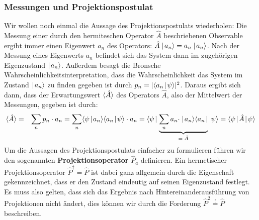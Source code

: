 \subsubsection{Messungen und Projektionspostulat}

Wir wollen noch einmal die Aussage des Projektionspostulats wiederholen: Die Messung einer durch den hermiteschen Operator $\hat{A}$ beschriebenen Observable ergibt immer einen Eigenwert $a_n$ des Operators: $\hat{A}\mid\!\!\!\,\,{a_n}\rangle=a_n\mid\!\!\!\,\,{a_n}\rangle$. Nach der Messung eines Eigenwerts $a_n$ befindet sich das System dann im zugehörigen Eigenzustand $\mid\!\!\!\,\,{a_n}\rangle$. Außerdem besagt die Bronsche Wahrscheinlichkeitsinterpretation, dass die Wahrscheinlichkeit das System im Zustand $\mid\!\!\!\,\,{a_n}\rangle$ zu finden gegeben ist durch $p_n=|\langle{a_n}\!\!\!\,\,\mid\!\!\!\,\,{\psi}\rangle|^2$. Daraus ergibt sich dann, dass der Erwartungswert $\langle\!\!\,\,\hat{A}\!\!\,\,\rangle$ des Operators $\hat{A}$, also der Mittelwert der Messungen, gegeben ist durch: 
\begin{eqnarray*}
	\EW{\hat{A}} &=& \sum_n p_n\cdot a_n = \sum_n \braket{\psi}{a_n}\braket{a_n}{\psi}\cdot a_n = \bra{\psi}\underbrace{\sum_n a_n\cdot \ket{a_n}\bra{a_n}}_{=\; \hat{A}}\;\psi\rangle = \bracket{\psi}{\hat{A}}{\psi}
\end{eqnarray*}
Um die Aussagen des Projektionspostulats einfacher zu formulieren führen wir den sogenannten {\bf Projektionsoperator} $\hat{P}_a$ definieren. Ein hermetischer Projektionsoperator $\hat{P}^{\dagger}=\hat{P}$ ist dabei ganz allgemein durch die Eigenschaft gekennzeichnet, dass er den Zustand eindeutig auf seinen Eigenzustand festlegt. Es muss also gelten, dass sich das Ergebnis nach Hintereinanderausführung von Projektionen nicht ändert, dies können wir durch die Forderung $\hat{P}^2\overset!=\hat{P}$ beschreiben. 

